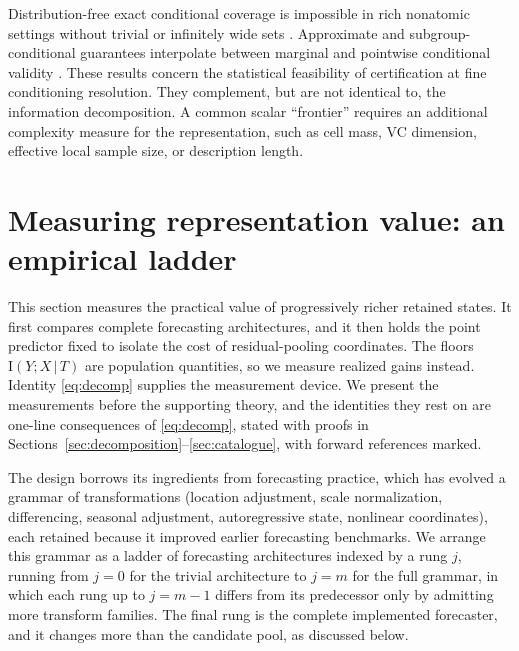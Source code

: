 \documentclass[11pt]{article}
\theoremstyle{remark}
\newcommand{\I}{\mathrm{I}}
\newcommand{\given}{\,|\,}
\begin{document}
Distribution-free exact conditional coverage is impossible in rich nonatomic settings without
trivial or infinitely wide sets \citep{lei2014distribution,barber2021limits}. Approximate and
subgroup-conditional guarantees interpolate between marginal and pointwise conditional validity
\citep{vovk2012conditional,gibbs2025conditional,braun2025conditional}. These results concern the
statistical feasibility of certification at fine conditioning resolution. They complement, but
are not identical to, the information decomposition. A common scalar ``frontier'' requires an
additional complexity measure for the representation, such as cell mass, VC dimension, effective
local sample size, or description length.

\section{Measuring representation value: an empirical ladder}\label{sec:ladder}

This section measures the practical value of progressively richer retained states. It first
compares complete forecasting architectures, and it then holds the point predictor fixed to
isolate the cost of residual-pooling coordinates. The floors $\I(Y;X\given T)$ are
population quantities, so we measure realized gains instead. Identity \eqref{eq:decomp} supplies the measurement device. We present
the measurements before the supporting theory, and the identities they rest on are one-line
consequences of \eqref{eq:decomp}, stated with proofs in
Sections~\ref{sec:decomposition}--\ref{sec:catalogue}, with forward references marked.

The design borrows its ingredients from forecasting practice, which has evolved a grammar of
transformations (location adjustment, scale normalization, differencing, seasonal adjustment,
autoregressive state, nonlinear coordinates), each retained because it improved earlier forecasting benchmarks. We arrange this grammar as a
ladder of forecasting architectures indexed by a rung $j$, running from $j=0$ for the trivial
architecture to $j=m$ for the full grammar, in which each rung up to $j=m-1$ differs from its predecessor only by admitting more
transform families. The final rung is the complete implemented forecaster, and it changes more than
the candidate pool, as discussed below.
\end{document}
